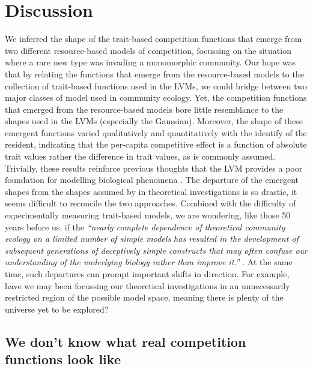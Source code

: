 \documentclass[a4paper,11pt]{article}
\begin{document}
\section{Discussion}

We inferred the shape of the trait-based competition functions that emerge from two different resource-based models of competition, focussing on the situation where a rare new type was invading a monomorphic community. Our hope was that by relating the functions that emerge from the resource-based models to the collection of trait-based functions used in the LVMs, we could bridge between two major classes of model used in community ecology. Yet, the competition functions that emerged from the resource-based models bore little resemblance to the shapes used in the LVMs (especially the Gaussian). Moreover, the shape of these emergent functions varied qualitatively and quantitatively with the identify of the resident, indicating that the per-capita competitive effect is a function of absolute trait values rather the difference in trait values, as is commonly assumed. Trivially, these results reinforce previous thoughts that the LVM provides a poor foundation for modelling biological phenomena \citep[e.g.][]{Andrewartha-1953,  Neill-1974, Abrams-1975, Wangersky-1978,Abrams-1980, Tilman-1987, Abrams-2008}. The departure of the emergent shapes from the shapes assumed by in theoretical investigations is so drastic, it seems difficult to reconcile the two approaches. Combined with the difficulty of experimentally measuring trait-based models, we are wondering, like those 50 years before us, if the  \emph{``nearly complete dependence of theoretical community ecology on a limited number of simple models has resulted in the development of subsequent generations of deceptively simple constructs that may often confuse our understanding of the underlying biology rather than improve it.''}  \citep{Neill-1974}. At the same time, such departures can prompt important shifts in direction. For example, have we may been focussing our theoretical investigations in an unnecessarily restricted region of the possible model space, meaning there is plenty of the universe yet to be explored?

\subsection{We don't know what real competition functions look like}
\end{document}
